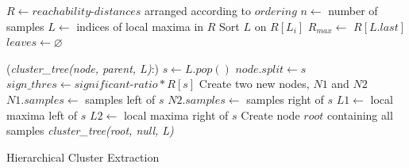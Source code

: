 \documentclass[a4paper]{report}
\begin{document}
{
    \fontsize{10}{12}
    \selectfont
    \begin{algorithm}[t]
        \DontPrintSemicolon
        \BlankLine
        \BlankLine

        $R \gets reachability$-$distances$ arranged according to $ordering$\;
        $n \gets$ number of samples\;
        $L \gets$ indices of local maxima in $R$\;
        Sort $L$ on $R[L_i]$\;
        $R_{max} \gets$ $R[L.last]$\;
        $leaves \gets \varnothing$\;

        \Fn(\emph{cluster\_tree(node, parent, L)}:){
            $s \gets L.pop()$\;
            $node.split \gets s$\;
            $sign\_thres \gets significant$-$ratio * R[s]$\;
            Create two new nodes, $N1$ and $N2$\;
            $N1.samples \gets$ samples left of $s$\;
            $N2.samples \gets$ samples right of $s$\;
            $L1 \gets $ local maxima left of $s$\;
            $L2 \gets $ local maxima right of $s$\;
        }
        \BlankLine
        Create node $root$ containing all samples\;
        \emph{cluster\_tree(root, null, L)}\;
        \BlankLine
        \caption{Hierarchical Cluster Extraction}
        \label{alg:hierextr}
    \end{algorithm}
}
\end{document}

